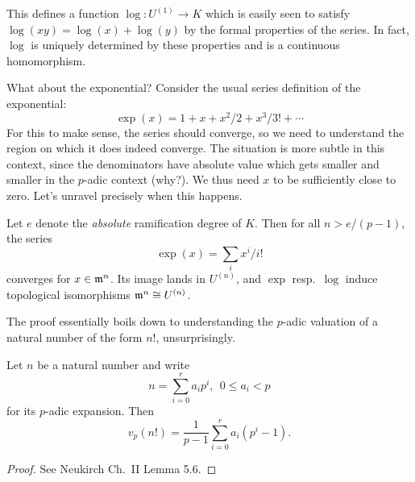This defines a function $\log : U^{(1)} \to K$ which is easily seen to satisfy $\log(x y) = \log(x) + \log(y)$ by the formal properties of the series.
In fact, $\log$ is uniquely determined by these properties and is a continuous homomorphism.

What about the exponential?
Consider the usual series definition of the exponential:
\[ \exp(x) = 1 + x + x^{2}/2 + x^{3}/3! + \cdots \]
For this to make sense, the series should converge, so we need to understand the region on which it does indeed converge.
The situation is more subtle in this context, since the denominators have absolute value which gets smaller and smaller in the $p$-adic context (why?).
We thus need $x$ to be sufficiently close to zero.
Let's unravel precisely when this happens.

\begin{proposition}
  Let $e$ denote the \emph{absolute} ramification degree of $K$.
  Then for all $n > e/(p-1)$, the series
  \[ \exp(x) = \sum_{i} x^{i}/i! \]
  converges for $x \in \mathfrak{m}^{n}$.
  Its image lands in $U^{(n)}$, and $\exp$ resp.~$\log$ induce topological isomorphisms $\mathfrak{m}^{n} \cong U^{(n)}$.
\end{proposition}

The proof essentially boils down to understanding the $p$-adic valuation of a natural number of the form $n!$, unsurprisingly.

\begin{lemma}
  Let $n$ be a natural number and write
  \[ n = \sum_{i = 0}^{r} a_{i} p^{i}, \ \ 0 \le a_{i} < p \]
  for its $p$-adic expansion.
  Then
  \[ v_{p}(n!) = \frac{1}{p-1} \sum_{i = 0}^{r} a_{i}(p^{i}-1). \]
\end{lemma}
\begin{proof}
  See Neukirch Ch.~II Lemma 5.6.
\end{proof}

